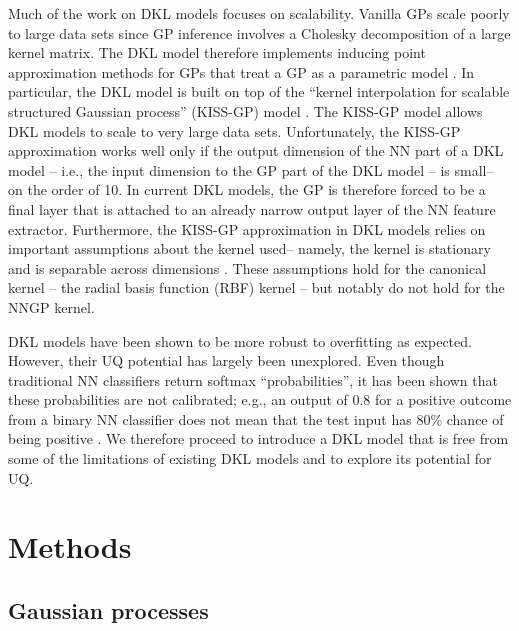 \documentclass{article}
\begin{document}
Much of the work on DKL models focuses on scalability. Vanilla GPs scale poorly to large data sets since GP inference involves a Cholesky decomposition of a large kernel matrix. The DKL model therefore implements inducing point approximation methods for GPs that treat a GP as a parametric model \cite{hensman2015scalable, titsias2009variational}. In particular, the DKL model is built on top of the ``kernel interpolation for scalable structured Gaussian process'' (KISS-GP) model \cite{wilson2015kernel}. The KISS-GP model allows DKL models to scale to very large data sets. Unfortunately, the KISS-GP approximation works well only if the output dimension of the NN part of a DKL model -- i.e., the input dimension to the GP part of the DKL model -- is small-- on the order of 10. In current DKL models, the GP is therefore forced to be a final layer that is attached to an already narrow output layer of the NN feature extractor. Furthermore, the KISS-GP approximation in DKL models relies on important assumptions about the kernel used-- namely, the kernel is stationary and is separable across dimensions \cite{wilson2015kernel}. These assumptions hold for the canonical kernel -- the radial basis function (RBF) kernel -- but notably do not hold for the NNGP kernel.

DKL models have been shown to be more robust to overfitting as expected. However, their UQ potential has largely been unexplored. Even though traditional NN classifiers return softmax ``probabilities'', it has been shown that these probabilities are not calibrated; e.g., an output of $0.8$ for a positive outcome from a binary NN classifier does not mean that the test input has 80\% chance of being positive \cite{guo2017calibration}. We therefore proceed to introduce a DKL model that is free from some of the limitations of existing DKL models and to explore its potential for UQ.

\section{Methods}

\subsection{Gaussian processes}
\end{document}
